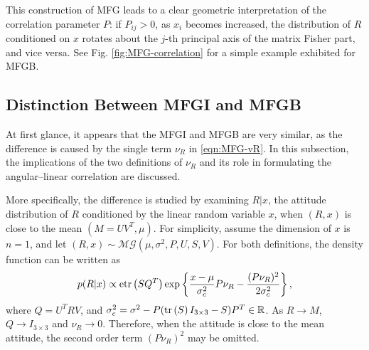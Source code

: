 This construction of MFG leads to a clear geometric interpretation of the correlation parameter $P$:
if $P_{ij} > 0$, as $x_i$ becomes increased, the distribution of $R$ conditioned on $x$ rotates about the $j$-th principal axis of the matrix Fisher part, and vice versa.
See Fig. \ref{fig:MFG-correlation} for a simple example exhibited for MFGB.

\subsection{Distinction Between MFGI and MFGB} \label{section:MFG-MFGI-MFGB}

At first glance, it appears that the MFGI and MFGB are very similar, as the difference is caused by the single term $\nu_R$ in \eqref{eqn:MFG-vR}.
In this subsection, the implications of the two definitions of $\nu_R$ and its role in formulating the angular--linear correlation are discussed.

More specifically, the difference is studied by examining $R|x$, the attitude distribution of $R$ conditioned by the linear random variable $x$, when $(R,x)$ is close to the mean $(M=UV^T, \mu)$.
For simplicity, assume the dimension of $x$ is $n=1$, and let $(R,x) \sim \mathcal{MG}(\mu,\allowbreak \sigma^2,\allowbreak P,\allowbreak U,\allowbreak S,\allowbreak V)$.
For both definitions, the density function can be written as
\begin{align*}
	p(R|x) \propto \mathrm{etr}\left( SQ^T \right) \exp\left\{ \frac{x-\mu}{\sigma_c^2}P\nu_R - \frac{(P\nu_R)^2}{2\sigma_c^2} \right\},
\end{align*}
where $Q = U^TRV$, and $\sigma_c^2 = \sigma^2 - P(\mathrm{tr}\left( S \right)I_{3\times 3}-S)P^T\in\mathbb{R}$.
As $R\rightarrow M$, $Q\rightarrow I_{3\times 3}$ and $\nu_R \rightarrow 0$.
Therefore, when the attitude is close to the mean attitude, the second order term $(P\nu_R)^2$ may be omitted.

